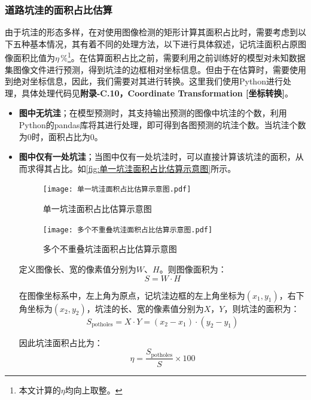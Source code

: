 \documentclass{MathorCupmodeling}
\begin{document}
	\subsubsection{道路坑洼的面积占比估算}
	由于坑洼的形态多样，在对使用图像检测的矩形计算其面积占比时，需要考虑到以下五种基本情况，其有着不同的处理方法，以下进行具体叙述，记坑洼面积占原图像面积比值为$\eta\,\%$\textcolor{blue}{\footnote{本文计算的$\eta$均向上取整。}}。在估算面积占比之前，需要利用之前训练好的模型对未知数据集图像文件进行预测，得到坑洼的边框相对坐标信息。但由于在估算时，需要使用到绝对坐标信息，因此，我们需要对其进行转换。这里我们使用Python进行处理，具体处理代码见\textbf{附录-C.10，Coordinate Transformation [坐标转换]}。
	\begin{itemize}
		\item \textbf{图中无坑洼}；在模型预测时，其支持输出预测的图像中坑洼的个数，利用Python的pandas库将其进行处理，即可得到各图预测的坑洼个数。当坑洼个数为0时，面积占比为0。
		\item \textbf{图中仅有一处坑洼}；当图中仅有一处坑洼时，可以直接计算该坑洼的面积，从而求得其占比。如\textcolor{blue}{\cref{fig:单一坑洼面积占比估算示意图}}所示。
		\begin{figure}[H]
			\centering
			\begin{minipage}{0.45\linewidth}
			  \centering
			  \texttt{[image: 单一坑洼面积占比估算示意图.pdf]}
			  \caption{单一坑洼面积占比估算示意图}
			  \label{fig:单一坑洼面积占比估算示意图}
			\end{minipage}
			\begin{minipage}{0.45\linewidth}
			  \centering
			  \texttt{[image: 多个不重叠坑洼面积占比估算示意图.pdf]}
			  \caption{多个不重叠坑洼面积占比估算示意图}
			  \label{fig:多个不重叠坑洼面积占比估算示意图}
			\end{minipage}
		\end{figure}
		定义图像长、宽的像素值分别为$W$、$H$。则图像面积为：
		\begin{equation}
			S=W\cdot H
		\end{equation}
		
		在图像坐标系中，左上角为原点，记坑洼边框的左上角坐标为$\left(x_1,y_1\right)$，右下角坐标为$\left(x_2,y_2\right)$，坑洼的长、宽的像素值分别为$X$，$Y$，则坑洼的面积为：
		\begin{equation}
			S_{\text{potholes}}=X\cdot Y=\left(x_2-x_1\right)\cdot\left(y_2-y_1\right)
		\end{equation}
		
		因此坑洼面积占比为：
		\begin{equation}
			\eta=\frac{S_{\text{potholes}}}{S}\times 100
		\end{equation}
		

\end{itemize}
\end{document}
